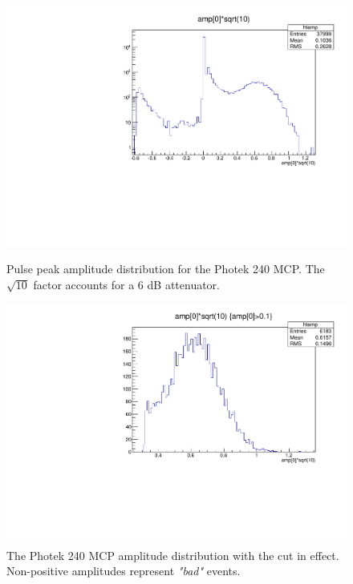 \documentclass[12pt]{article}
\begin{document}
\begin{figure}[t]
\centering
\begin{minipage}[t]{.49\textwidth}
	\centering
	\includegraphics[width=\textwidth]{AmpCut0.pdf}
	\caption{Pulse peak amplitude distribution for the Photek 240 MCP. 
		The $\sqrt{10}$ factor accounts for a 6 dB attenuator.}
	\label{fig:AmpCut0}
\end{minipage} \hfill
\begin{minipage}[t]{.49\textwidth}
	\centering
	\includegraphics[width=\textwidth]{AmpCut1.pdf}
	\caption{The Photek 240 MCP amplitude distribution with the cut in effect. 
		Non-positive amplitudes represent \textit{"bad"} events.}
	\label{fig:AmpCut1}
\end{minipage}
\end{figure}
\end{document}
